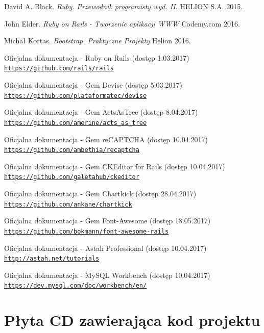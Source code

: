 \documentclass[brudnopis]{xmgr}
\begin{document}
\begin{thebibliography}{9}

David A. Black.
\textit{Ruby. Przewodnik programisty wyd. II.}
HELION S.A. 2015.

John Elder.
\textit{Ruby on Rails - Tworzenie aplikacji WWW}
Codemy.com 2016.

Michał Kortas.
\textit{Bootstrap. Praktyczne Projekty}
Helion 2016.

Oficjalna dokumentacja - Ruby on Rails (dostęp 1.03.2017)
\\\texttt{\url{https://github.com/rails/rails}}


Oficjalna dokumentacja - Gem Devise (dostęp 5.03.2017)
\\\texttt{\url{https://github.com/plataformatec/devise}}


Oficjalna dokumentacja - Gem ActsAsTree (dostęp 8.04.2017)
\\\texttt{\url{https://github.com/amerine/acts_as_tree}}


Oficjalna dokumentacja - Gem reCAPTCHA  (dostęp 10.04.2017)
\\\texttt{\url{https://github.com/ambethia/recaptcha}}


Oficjalna dokumentacja - Gem CKEditor for Rails (dostęp 10.04.2017)
\\\texttt{\url{https://github.com/galetahub/ckeditor}}


Oficjalna dokumentacja - Gem Chartkick (dostęp 28.04.2017)
\\\texttt{\url{https://github.com/ankane/chartkick}}


Oficjalna dokumentacja - Gem Font-Awesome (dostęp 18.05.2017)
\\\texttt{\url{https://github.com/bokmann/font-awesome-rails}}


Oficjalna dokumentacja - Astah Professional (dostęp 10.04.2017)
\\\texttt{\url{http://astah.net/tutorials}}


Oficjalna dokumentacja - MySQL Workbench (dostęp 10.04.2017)
\\\texttt{\url{https://dev.mysql.com/doc/workbench/en/}}

\end{thebibliography}

\appendix
\chapter{Płyta CD zawierająca kod projektu}


\listoffigures


\oswiadczenie
\end{document}

